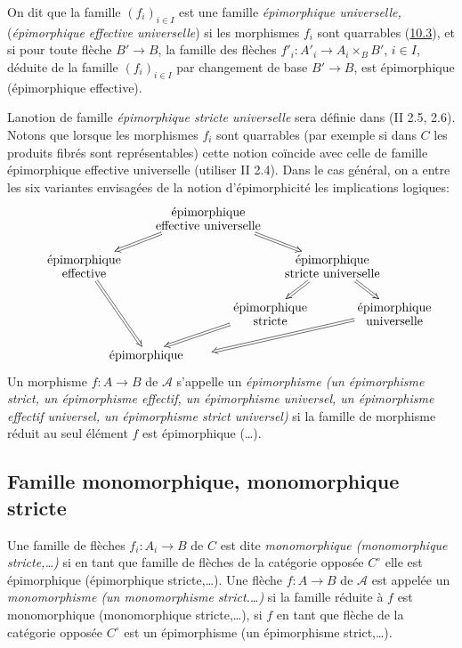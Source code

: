 \documentclass[10pt]{../fichiers-configuration-latex/smfart}
\begin{document}
On dit que la famille $(f_i)_{i\in I}$ est une famille
\emph{épimorphique universelle,} (\resp\break \emph{épimorphique
effective universelle}) si les morphismes $f_i$ sont quarrables
(\hyperref[I.sec10.3]{10.3}), et si pour toute flèche $B'\rightarrow B$, la
famille des
flèches $f'_i:A'_i\rightarrow A_i\times_B B'$, $i\in I$, déduite de
la famille $(f_i)_{i\in I}$ par changement de base $B'\rightarrow
B$, est épimorphique (\resp épimorphique effective).

La\pageoriginale notion de famille \emph{épimorphique stricte
universelle} sera définie dans (II 2.5, 2.6). Notons que lorsque les
morphismes $f_i$ sont quarrables (par exemple si dans $C$ les
produits fibrés sont représentables) cette notion coïncide avec
celle de famille épimorphique effective universelle (utiliser II
2.4). Dans le cas général, on a entre les six variantes envisagées
de la notion d'épimorphicité les implications logiques:
\[
\xymatrix@C=-1cm@R=.5cm{
  &   & \txt<3cm>{épimorphique effective universelle} \ar@{=>}[lld]\ar@{=>}[rrd] &     & &\\
\txt<3cm>{épimorphique effective} \ar@{=>}[rdd]       &   &    &     &  \txt<3cm>{épimorphique stricte universelle} \ar@{=>}[rd] \ar@{=>}[ld]&\\
 &   &    &   \txt{épimorphique\\ stricte}
         \ar@{=>}[lld]&     & \txt{épimorphique \\universelle} \ar@{=>}[llld]\\
         & \txt{épimorphique}&    &     &      &
}
\]
Un morphisme $f:A\rightarrow B$ de $𝒜$ s'appelle un
\emph{épimorphisme (\resp un épimorphisme strict, \resp un
épimorphisme effectif, \resp un épimorphisme universel, \resp un
épimorphisme effectif universel, \resp un épimorphisme strict
universel)} si la famille de morphisme réduit au seul élément $f$
est épimorphique (\resp\ldots).

\subsection{Famille monomorphique, monomorphique
  stricte}

\etc Une famille de flèches $f_i:A_i\rightarrow B$ de $C$ est dite
\emph{monomorphique (\resp monomorphique stricte,\ldots)} si en tant
que famille de flèches de la catégorie opposée $C^{\circ}$ elle est
épimorphique (\resp épimorphique stricte,\ldots). Une flèche
$f:A\rightarrow B$ de $𝒜$ est appelée un \emph{monomorphisme
(\resp un monomorphisme strict.\ldots)} si la famille réduite à $f$
est monomorphique (\resp\pageoriginale monomorphique
stricte,\ldots), \ie si $f$ en tant que flèche de la catégorie
opposée $C^{\circ}$ est un épimorphisme (\resp un épimorphisme
strict,\ldots).
\end{document}
